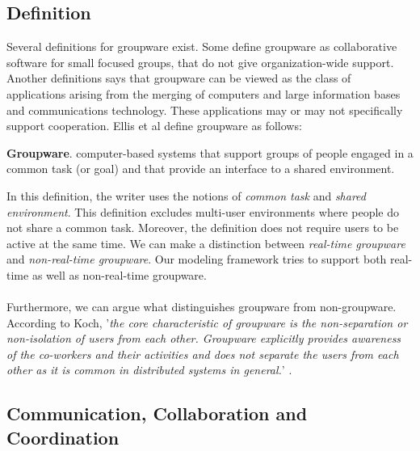\subsection{Definition}

Several definitions for groupware exist. Some define groupware as collaborative software for small focused groups, that do not give organization-wide support. Another definitions says that groupware can be viewed as the class of applications arising from the merging of computers and large information bases and communications technology. These applications may or may not specifically support cooperation. Ellis et al define groupware as follows:
\begin{mydef}
\textbf{Groupware}. computer-based systems that support groups of people engaged in a common task (or goal) and that provide an interface to a shared environment. \cite{CSCWGroupware}
\end{mydef}
In this definition, the writer uses the notions of \textit{common task} and \textit{shared environment}. This definition excludes multi-user environments where people do not share a common task. Moreover, the definition does not require users to be active at the same time. We can make a distinction between \textit{real-time groupware} and \textit{non-real-time groupware}. Our modeling framework tries to support both real-time as well as non-real-time groupware.
\\ \\
Furthermore, we can argue what distinguishes groupware from non-groupware. According to Koch, '\textit{the core characteristic of groupware is the non-separation or non-isolation of users from each other. Groupware explicitly provides awareness of the co-workers and their activities and does not separate the users from each other as it is common in distributed systems in general.}' \cite{CSCWConcepts}.

\subsection{Communication, Collaboration and Coordination}

